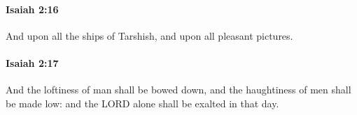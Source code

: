 		\paragraph{Isaiah 2:16} %
			\label{ISAIAH-2-16}

			And upon all the ships of Tarshish, and upon all pleasant pictures.


		\paragraph{Isaiah 2:17} %
			\label{ISAIAH-2-17}

			And the loftiness of man shall be bowed down, and the haughtiness of men shall be made low: and the LORD alone shall be exalted in that day.


